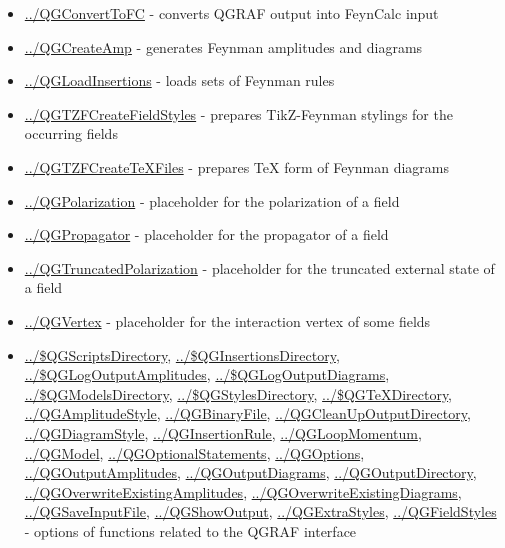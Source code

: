 \documentclass[../FeynHelpersManual.tex]{subfiles}
\begin{document}
\begin{itemize}
\tightlist
\item
  \hyperlink{../qgconverttofc}{../QGConvertToFC} - converts QGRAF output
  into FeynCalc input
\item
  \hyperlink{../qgcreateamp}{../QGCreateAmp} - generates Feynman
  amplitudes and diagrams
\item
  \hyperlink{../qgloadinsertions}{../QGLoadInsertions} - loads sets of
  Feynman rules
\item
  \hyperlink{../qgtzfcreatefieldstyles}{../QGTZFCreateFieldStyles} -
  prepares TikZ-Feynman stylings for the occurring fields
\item
  \hyperlink{../qgtzfcreatetexfiles}{../QGTZFCreateTeXFiles} - prepares
  TeX form of Feynman diagrams
\item
  \hyperlink{../qgpolarization}{../QGPolarization} - placeholder for the
  polarization of a field
\item
  \hyperlink{../qgpropagator}{../QGPropagator} - placeholder for the
  propagator of a field
\item
  \hyperlink{../qgtruncatedpolarization}{../QGTruncatedPolarization} -
  placeholder for the truncated external state of a field
\item
  \hyperlink{../qgvertex}{../QGVertex} - placeholder for the interaction
  vertex of some fields
\item
  \hyperlink{../dollarqgscriptsdirectory}{../\$QGScriptsDirectory},
  \hyperlink{../dollarqginsertionsdirectory}{../\$QGInsertionsDirectory},
  \hyperlink{../dollarqglogoutputamplitudes}{../\$QGLogOutputAmplitudes},
  \hyperlink{../dollarqglogoutputdiagrams}{../\$QGLogOutputDiagrams},
  \hyperlink{../dollarqgmodelsdirectory}{../\$QGModelsDirectory},
  \hyperlink{../dollarqgstylesdirectory}{../\$QGStylesDirectory},
  \hyperlink{../dollarqgtexdirectory}{../\$QGTeXDirectory},
  \hyperlink{../qgamplitudestyle}{../QGAmplitudeStyle},
  \hyperlink{../qgbinaryfile}{../QGBinaryFile},
  \hyperlink{../qgcleanupoutputdirectory}{../QGCleanUpOutputDirectory},
  \hyperlink{../qgdiagramstyle}{../QGDiagramStyle},
  \hyperlink{../qginsertionrule}{../QGInsertionRule},
  \hyperlink{../qgloopmomentum}{../QGLoopMomentum},
  \hyperlink{../qgmodel}{../QGModel},
  \hyperlink{../qgoptionalstatements}{../QGOptionalStatements},
  \hyperlink{../qgoptions}{../QGOptions},
  \hyperlink{../qgoutputamplitudes}{../QGOutputAmplitudes},
  \hyperlink{../qgoutputdiagrams}{../QGOutputDiagrams},
  \hyperlink{../qgoutputdirectory}{../QGOutputDirectory},
  \hyperlink{../qgoverwriteexistingamplitudes}{../QGOverwriteExistingAmplitudes},
  \hyperlink{../qgoverwriteexistingdiagrams}{../QGOverwriteExistingDiagrams},
  \hyperlink{../qgsaveinputfile}{../QGSaveInputFile},
  \hyperlink{../qgshowoutput}{../QGShowOutput},
  \hyperlink{../qgextrastyles}{../QGExtraStyles},
  \hyperlink{../qgfieldstyles}{../QGFieldStyles} - options of functions
  related to the QGRAF interface
\end{itemize}
\end{document}
